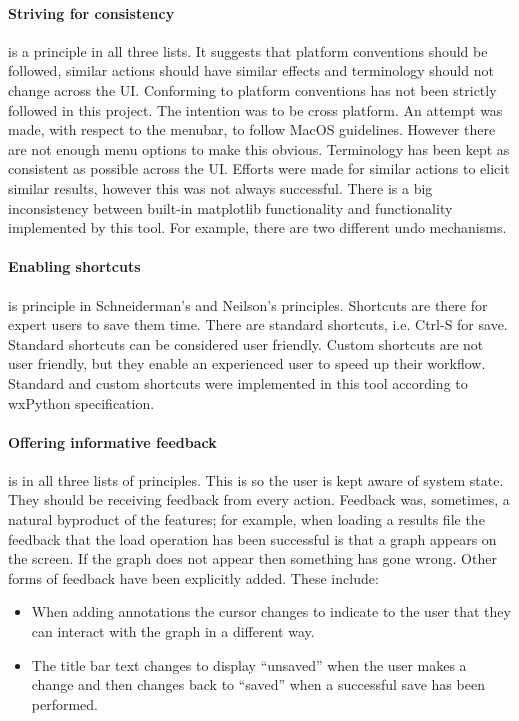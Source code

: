 \paragraph*{Striving for consistency} is a principle in all three lists.  It suggests that platform conventions should be followed, similar actions should have similar effects and terminology should not change across the \ac{UI}.  Conforming to platform conventions has not been strictly followed in this project.  The intention was to be cross platform.  An attempt was made, with respect to the menubar, to follow MacOS guidelines.  However there are not enough menu options to make this obvious.  Terminology has been kept as consistent as possible across the \ac{UI}.  Efforts were made for similar actions to elicit similar results, however this was not always successful.  There is a big inconsistency between built-in matplotlib functionality and functionality implemented by this tool.  For example, there are two different undo mechanisms.

\paragraph*{Enabling shortcuts} is principle in Schneiderman's and Neilson's principles.  Shortcuts are there for expert users to save them time.  There are standard shortcuts, i.e. Ctrl-S for save.  Standard shortcuts can be considered user friendly.  Custom shortcuts are not user friendly, but they enable an experienced user to speed up their workflow.  Standard and custom shortcuts were implemented in this tool according to wxPython specification.

\paragraph*{Offering informative feedback} is in all three lists of principles.  This is so the user is kept aware of system state.  They should be receiving feedback from every action. Feedback was, sometimes, a natural byproduct of the features; for example, when loading a results file the feedback that the load operation has been successful is that a graph appears on the screen. If the graph does not appear then something has gone wrong.  Other forms of feedback have been explicitly added.  These include:
\begin{itemize}
\item When adding annotations the cursor changes to indicate to the user that they can interact with the graph in a different way.
\item The title bar text changes to display ``unsaved'' when the user makes a change and then changes back to ``saved'' when a successful save has been performed.
\end{itemize}

